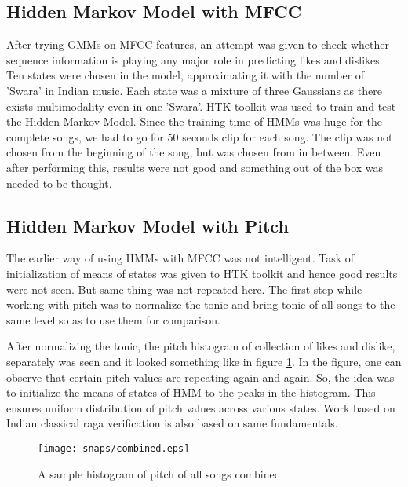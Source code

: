 \subsection{Hidden Markov Model with MFCC}
After trying GMMs on MFCC features, an attempt was given to check whether sequence information is playing any major role in predicting likes and dislikes. Ten states were chosen in the model, approximating it with the number of 'Swara' in Indian music. Each state was a mixture of three Gaussians as there exists multimodality even in one 'Swara'. HTK toolkit was used to train and test the Hidden Markov Model. Since the training time of HMMs was huge for the complete songs, we had to go for 50 seconds clip for each song. The clip was not chosen from the beginning of the song, but was chosen from in between. Even after performing this, results were not good and something out of the box was needed to be thought.

\subsection{Hidden Markov Model with Pitch}
\label{sub:HMM}
The earlier way of using HMMs with MFCC was not intelligent. Task of initialization of means of states was given to HTK toolkit and hence good results were not seen. But same thing was not repeated here. The first step while working with pitch was to normalize the tonic and bring tonic of all songs to the same level so as to use them for comparison.\par
After normalizing the tonic, the pitch histogram of collection of likes and dislike, separately was seen and it looked something like in figure \ref{fig:hist}. In the figure, one can observe that certain pitch values are repeating again and again. So, the idea was to initialize the means of states of HMM to the peaks in the histogram. This ensures uniform distribution of pitch values across various states. Work based on Indian classical raga verification is also based on same fundamentals.
\begin{figure}[!htbp]
\centering
\texttt{[image: snaps/combined.eps]}
\caption{A sample histogram of pitch of all songs combined.}
\label{fig:hist}
\end{figure}
